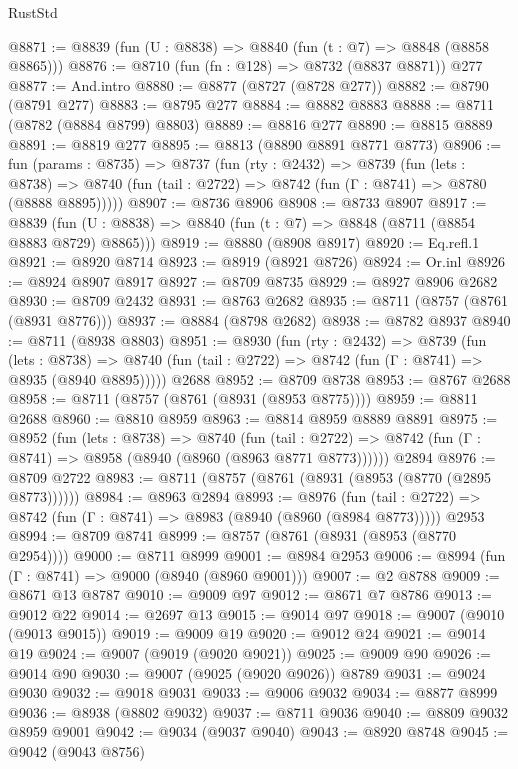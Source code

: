 \begin{lexlean}{RustStd}
\begin{coremodule}
@8871 := @8839 (fun (U : @8838) => @8840 (fun (t : @7) => @8848 (@8858 @8865)))
@8876 := @8710 (fun (fn : @128) => @8732 (@8837 @8871)) @277
@8877 := And.intro
@8880 := @8877 (@8727 (@8728 @277))
@8882 := @8790 (@8791 @277)
@8883 := @8795 @277
@8884 := @8882 @8883
@8888 := @8711 (@8782 (@8884 @8799) @8803)
@8889 := @8816 @277
@8890 := @8815 @8889
@8891 := @8819 @277
@8895 := @8813 (@8890 @8891 @8771 @8773)
@8906 := fun (params : @8735) =>
  @8737
    (fun (rty : @2432) =>
    @8739
      (fun (lets : @8738) =>
      @8740 (fun (tail : @2722) => @8742 (fun (Γ : @8741) => @8780 (@8888 @8895)))))
@8907 := @8736 @8906
@8908 := @8733 @8907
@8917 := @8839 (fun (U : @8838) => @8840 (fun (t : @7) => @8848 (@8711 (@8854 @8883 @8729) @8865)))
@8919 := @8880 (@8908 @8917)
@8920 := Eq.refl.{1}
@8921 := @8920 @8714
@8923 := @8919 (@8921 @8726)
@8924 := Or.inl
@8926 := @8924 @8907 @8917
@8927 := @8709 @8735
@8929 := @8927 @8906 @2682
@8930 := @8709 @2432
@8931 := @8763 @2682
@8935 := @8711 (@8757 (@8761 (@8931 @8776)))
@8937 := @8884 (@8798 @2682)
@8938 := @8782 @8937
@8940 := @8711 (@8938 @8803)
@8951 := @8930
    (fun (rty : @2432) =>
    @8739
      (fun (lets : @8738) =>
      @8740 (fun (tail : @2722) => @8742 (fun (Γ : @8741) => @8935 (@8940 @8895)))))
    @2688
@8952 := @8709 @8738
@8953 := @8767 @2688
@8958 := @8711 (@8757 (@8761 (@8931 (@8953 @8775))))
@8959 := @8811 @2688
@8960 := @8810 @8959
@8963 := @8814 @8959 @8889 @8891
@8975 := @8952
    (fun (lets : @8738) =>
    @8740
      (fun (tail : @2722) => @8742 (fun (Γ : @8741) => @8958 (@8940 (@8960 (@8963 @8771 @8773))))))
    @2894
@8976 := @8709 @2722
@8983 := @8711 (@8757 (@8761 (@8931 (@8953 (@8770 (@2895 @8773))))))
@8984 := @8963 @2894
@8993 := @8976
    (fun (tail : @2722) => @8742 (fun (Γ : @8741) => @8983 (@8940 (@8960 (@8984 @8773)))))
    @2953
@8994 := @8709 @8741
@8999 := @8757 (@8761 (@8931 (@8953 (@8770 @2954))))
@9000 := @8711 @8999
@9001 := @8984 @2953
@9006 := @8994 (fun (Γ : @8741) => @9000 (@8940 (@8960 @9001)))
@9007 := @2 @8788
@9009 := @8671 @13 @8787
@9010 := @9009 @97
@9012 := @8671 @7 @8786
@9013 := @9012 @22
@9014 := @2697 @13
@9015 := @9014 @97
@9018 := @9007 (@9010 (@9013 @9015))
@9019 := @9009 @19
@9020 := @9012 @24
@9021 := @9014 @19
@9024 := @9007 (@9019 (@9020 @9021))
@9025 := @9009 @90
@9026 := @9014 @90
@9030 := @9007 (@9025 (@9020 @9026)) @8789
@9031 := @9024 @9030
@9032 := @9018 @9031
@9033 := @9006 @9032
@9034 := @8877 @8999
@9036 := @8938 (@8802 @9032)
@9037 := @8711 @9036
@9040 := @8809 @9032 @8959 @9001
@9042 := @9034 (@9037 @9040)
@9043 := @8920 @8748
@9045 := @9042 (@9043 @8756)

\end{coremodule}
\end{lexlean}
